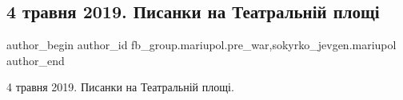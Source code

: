  
 
 
 
 

\subsection{4 травня 2019. Писанки на Театральній площі}
\label{sec:07_02_2023.fb.fb_group.mariupol.pre_war.3.4_travnya_2019__pisa}
 
\ifcmt
 author_begin
   author_id fb_group.mariupol.pre_war,sokyrko_jevgen.mariupol
 author_end
\fi

4 травня 2019. Писанки на Театральній площі.

